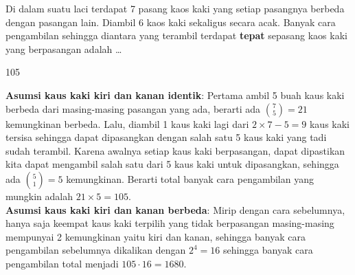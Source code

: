 \documentclass[12pt]{scrartcl}
\begin{document}
\begin{soalbaru}
Di dalam suatu laci terdapat 7 pasang kaos kaki yang setiap pasangnya berbeda dengan pasangan lain. Diambil 6 kaos kaki sekaligus secara acak. Banyak cara pengambilan sehingga diantara yang terambil terdapat \textbf{tepat} sepasang kaos kaki yang berpasangan adalah \dots
\end{soalbaru}
\begin{jawaban}
105
\end{jawaban}
\begin{solusi}
\textbf{Asumsi kaus kaki kiri dan kanan identik}: Pertama ambil 5 buah kaus kaki berbeda dari masing-masing pasangan yang ada, berarti ada ${7 \choose 5} = 21$ kemungkinan berbeda. Lalu, diambil 1 kaus kaki lagi dari $2 \times 7 - 5 = 9$ kaus kaki tersisa sehingga dapat dipasangkan dengan salah satu 5 kaus kaki yang tadi sudah terambil. Karena awalnya setiap kaus kaki berpasangan, dapat dipastikan kita dapat mengambil salah satu dari 5 kaus kaki untuk dipasangkan, sehingga ada ${5 \choose 1}=5$ kemungkinan. Berarti total banyak cara pengambilan yang mungkin adalah $21 \times 5 = \boxed{105}$.\\
\textbf{Asumsi kaus kaki kiri dan kanan berbeda}: Mirip dengan cara sebelumnya, hanya saja keempat kaus kaki terpilih yang tidak berpasangan masing-masing mempunyai 2 kemungkinan yaitu kiri dan kanan, sehingga banyak cara pengambilan sebelumnya dikalikan dengan $2^4 = 16$ sehingga banyak cara pengambilan total menjadi $105 \cdot 16 = \boxed{1680}$.
\end{solusi}
\end{document}
